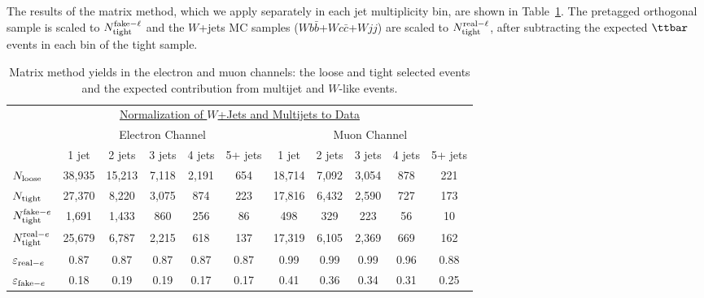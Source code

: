 The results of the matrix method, which we apply separately in each
jet multiplicity bin, are shown in Table~\ref{mm-numbers}. The
pretagged orthogonal sample is scaled to $N_{\rm tight}^{{\rm
fake-}\ell}$ and the $W$+jets MC samples
($Wb\bar{b}$+$Wc\bar{c}$+$Wjj$) are scaled to $N_{\rm tight}^{{\rm
real-}\ell}$, after subtracting the expected $\ttbar$ events in each
bin of the tight sample.

\vspace{0.2in}
\begin{table}[!h!tbp]
\begin{center}
\begin{minipage}{6.5in}
\begin{ruledtabular}
\begin{tabular}{l||ccccc|ccccc}
\multicolumn{11}{c}{\hspace{1in}\underline{Normalization of $W$+Jets and Multijets to Data}}\vspace{0.1in} \\
& \multicolumn{5}{c|}{Electron Channel} & \multicolumn{5}{c}{Muon Channel}    \\
                               & 1 jet  & 2 jets & 3 jets & 4 jets & 5+ jets
                               & 1 jet  & 2 jets & 3 jets & 4 jets & 5+ jets \\
\hline
$N_{{\rm loose}}$              & 38,935 & 15,213 &  7,118 &  2,191 &   654  & 18,714 &  7,092 &  3,054 &   878  &   221 \\
$N_{{\rm tight}}$              & 27,370 &  8,220 &  3,075 &    874 &   223  & 17,816 &  6,432 &  2,590 &   727  &   173 \\
$N_{\rm tight}^{{\rm fake-}e}$ &  1,691 &  1,433 &    860 &    256 &    86  &    498 &    329 &    223 &    56  &    10 \\
$N_{\rm tight}^{{\rm real-}e}$ & 25,679 &  6,787 &  2,215 &    618 &   137  & 17,319 &  6,105 &  2,369 &   669  &   162 \\
$\varepsilon_{{\rm real-}e}$   &   0.87 &   0.87 &   0.87 &   0.87 &  0.87  &   0.99 &   0.99 &   0.99 &  0.96  &  0.88 \\
$\varepsilon_{{\rm fake-}e}$   &   0.18 &   0.19 &   0.19 &   0.17 &  0.17  &   0.41 &   0.36 &   0.34 &  0.31  &  0.25
\end{tabular}
\end{ruledtabular}
\vspace{-0.1in}
\caption[mmnumbers]{Matrix method yields in the electron and muon channels:
the loose and tight selected events and the expected contribution from
multijet and $W$-like events.}
\label{mm-numbers}
\end{minipage}
\end{center}
\end{table}

